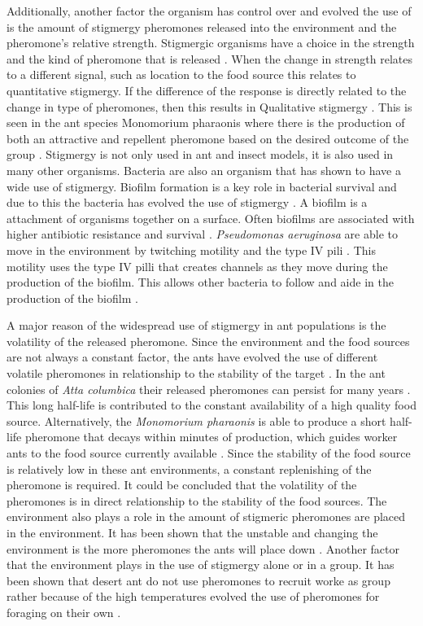 Additionally, another factor the organism has control over and evolved the use of is the amount of stigmergy pheromones released into the environment and the pheromone’s relative strength.
Stigmergic organisms have a choice in the strength and the kind of pheromone that is released \cite{dorigo_ant_2000}.
When the change in strength relates to a different signal, such as location to the food source this relates to quantitative stigmergy.
If the difference of the response is directly related to the change in type of pheromones, then this results in Qualitative stigmergy \cite{heylighen_stigmergy_2016b}.
This is seen in the ant species Monomorium pharaonis where there is the production of both an attractive and repellent pheromone based on the desired outcome of the group \cite{jeanson_pheromone_2003}.
Stigmergy is not only used in ant and insect models, it is also used in many other organisms.
Bacteria are also an organism that has shown to have a wide use of stigmergy.
Biofilm formation is a key role in bacterial survival and due to this the bacteria has evolved the use of stigmergy \cite{gloag_bacterial_2015}.
A biofilm is a attachment of organisms together on a surface.
Often biofilms are associated with higher antibiotic resistance and survival \cite{donlan2002biofilms}.
\textit{Pseudomonas aeruginosa} are able to move in the environment by twitching motility and the type IV pili \cite{persat2015type}.
This motility uses the type IV pilli that creates channels as they move during the production of the biofilm.
This allows other bacteria to follow and aide in the production of the biofilm \cite{gloag_stigmergy:_2013}.

A major reason of the widespread use of stigmergy in ant populations is the volatility of the released pheromone.
Since the environment and the food sources are not always a constant factor, the ants have evolved the use of different volatile pheromones in relationship to the stability of the target \cite{jeanson_pheromone_2003}.
In the ant colonies of \textit{Atta columbica} their released pheromones can persist for many years \cite{howard_costs_2001}.
This long half-life is contributed to the constant availability of a high quality food source.
Alternatively, the \textit{Monomorium pharaonis} is able to produce a short half-life pheromone that decays within minutes of production, which guides worker ants to the food source currently available \cite{robinson_decay_2008}.
Since the stability of the food source is relatively low in these ant environments, a constant replenishing of the pheromone is required.
It could be concluded that the volatility of the pheromones is in direct relationship to the stability of the food sources.
The environment also plays a role in the amount of stigmeric pheromones are placed in the environment.
It has been shown that the unstable and changing the environment is the more pheromones the ants will place down \cite{czaczkes2015trail}.
Another factor that the environment plays in the use of stigmergy alone or in a group.
It has been shown that desert ant do not use pheromones to recruit worke as group rather because of the high temperatures evolved the use of pheromones for foraging on their own \cite{ruano_high_2000}.


